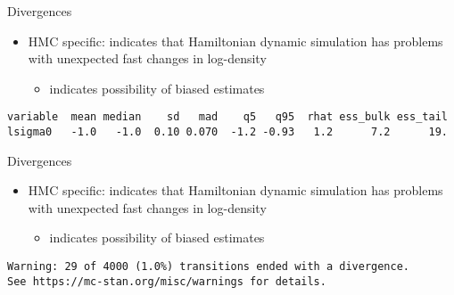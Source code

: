 \documentclass[finnish,english,t]{beamer}
\begin{document}
\begin{frame}[fragile]{Divergences}

  \begin{itemize}
  \item HMC specific: indicates that Hamiltonian dynamic simulation
    has problems with unexpected fast changes in log-density
    \begin{itemize}
    \item indicates possibility of biased estimates
    \end{itemize}
  \end{itemize}

     \vspace{-1\baselineskip}
     \footnotesize
\begin{verbatim}
variable  mean median    sd   mad    q5   q95  rhat ess_bulk ess_tail
lsigma0   -1.0   -1.0  0.10 0.070  -1.2 -0.93   1.2      7.2      19.
\end{verbatim}
     
\end{frame}

\begin{frame}[fragile]{Divergences}

  \begin{itemize}
  \item HMC specific: indicates that Hamiltonian dynamic simulation
    has problems with unexpected fast changes in log-density
    \begin{itemize}
    \item indicates possibility of biased estimates
    \end{itemize}
  \end{itemize}
     
     \vspace{-1\baselineskip}
     \footnotesize
\begin{verbatim}
Warning: 29 of 4000 (1.0%) transitions ended with a divergence.
See https://mc-stan.org/misc/warnings for details.
\end{verbatim}
     
\end{frame}
\end{document}
